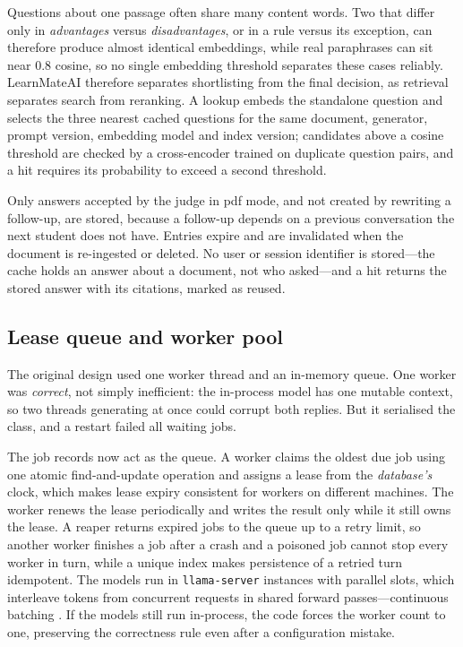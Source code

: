 \documentclass[conference]{IEEEtran}
\newcommand{\sys}{LearnMateAI}
\begin{document}
Questions about one passage often share many content words. Two that differ only in \emph{advantages}
versus \emph{disadvantages}, or in a rule versus its exception, can therefore produce almost identical
embeddings, while real paraphrases can sit near $0.8$ cosine, so no single embedding threshold separates
these cases reliably. \sys{} therefore separates shortlisting from the final decision, as retrieval
separates search from reranking. A lookup embeds the standalone question and selects the three nearest
cached questions for the same document, generator, prompt version, embedding model and index version;
candidates above a cosine threshold are checked by a cross-encoder trained on duplicate question pairs,
and a hit requires its probability to exceed a second threshold.

Only answers accepted by the judge in pdf mode, and not created by rewriting a follow-up, are stored, because a
follow-up depends on a previous conversation the next student does not have. Entries expire and are invalidated
when the document is re-ingested or deleted. No user or session identifier is stored---the cache holds an answer
about a document, not who asked---and a hit returns the stored answer with its citations, marked as reused.

\subsection{Lease queue and worker pool}
\label{sec:serving}

The original design used one worker thread and an in-memory queue. One worker was \emph{correct}, not simply
inefficient: the in-process model has one mutable context, so two threads generating at once could corrupt
both replies. But it serialised the class, and a restart failed all waiting jobs.

The job records now act as the queue. A worker claims the oldest due job using one atomic
find-and-update operation and assigns a lease from the \emph{database's} clock, which makes lease
expiry consistent for workers on different machines. The worker renews the lease periodically and
writes the result only while it still owns the lease. A reaper returns expired jobs to the queue up to
a retry limit, so another worker finishes a job after a crash and a poisoned job cannot stop every
worker in turn, while a unique index makes persistence of a retried turn idempotent. The models run in
\texttt{llama-server} instances with parallel slots, which interleave tokens from concurrent requests
in shared forward passes---continuous batching \cite{yu2022orca}. If the models still run in-process,
the code forces the worker count to one, preserving the correctness rule even after a configuration
mistake.
\end{document}
